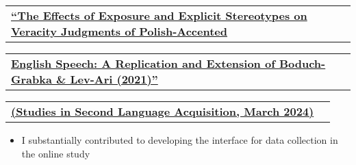 \documentclass[letterpaper,11pt]{article}
\makeatletter
\newcommand{\resumeItem}[1]{
  \item{
    {#1 \vspace{-4pt}}
  }
}
\newcommand{\resumeSubheading}[4]{
  \vspace{-5pt}\item
    \begin{tabular*}{0.97\textwidth}[t]{l@{\extracolsep{\fill}}r}
      \textbf{#1} & #2 \\
    \end{tabular*}\vspace{-10pt}
}
\newcommand{\resumeItemListStart}{\begin{itemize}}
\newcommand{\resumeItemListEnd}{\end{itemize}\vspace{-5pt}}
\makeatother
\begin{document}
    \resumeSubheading
        {{\href{{https://www.cambridge.org/core/journals/studies-in-second-language-acquisition/article/effects-of-exposure-and-explicit-stereotypes-on-veracity-judgments-of-polishaccented-english-speech-a-preregistered-close-replication-and-extension-of-boduchgrabka-levari-2021/EF03B7A762B1442206B537F0AD4447A4}}{``The Effects of Exposure and Explicit Stereotypes on Veracity Judgments of Polish-Accented}}}{}{}{}
    \vspace{-9pt}
    \resumeSubheading
        {{\href{{https://www.cambridge.org/core/journals/studies-in-second-language-acquisition/article/effects-of-exposure-and-explicit-stereotypes-on-veracity-judgments-of-polishaccented-english-speech-a-preregistered-close-replication-and-extension-of-boduchgrabka-levari-2021/EF03B7A762B1442206B537F0AD4447A4}}{English Speech: A Replication and Extension of Boduch-Grabka \& Lev-Ari (2021)''}}}{}{}{}
    \vspace{-9pt}
        \resumeSubheading
            {{\href{{https://www.cambridge.org/core/journals/studies-in-second-language-acquisition/article/effects-of-exposure-and-explicit-stereotypes-on-veracity-judgments-of-polishaccented-english-speech-a-preregistered-close-replication-and-extension-of-boduchgrabka-levari-2021/EF03B7A762B1442206B537F0AD4447A4}}{(Studies in Second Language Acquisition, March 2024)}}}{}{}{}
        \resumeItemListStart\small
            \resumeItem{I substantially contributed to developing the interface for data collection in the online study}
        \resumeItemListEnd
\end{document}
